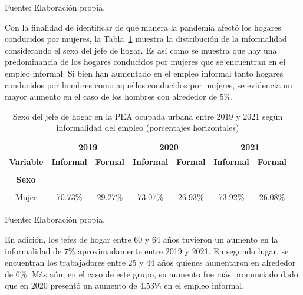 \documentclass[
  letterpaper,
  12pt,
  oneside,
  spanish,
  doublespacing,
  headsepline,
  parskip]{MastersDoctoralThesis}
\begin{document}
\noindent \small Fuente: Elaboración propia. \normalsize

Con la finalidad de identificar de qué manera la pandemia afectó los
hogares conducidos por mujeres, la Tabla~\ref{tbl-sex} muestra la
distribución de la informalidad considerando el sexo del jefe de hogar.
Es así como se muestra que hay una predominancia de los hogares
conducidos por mujeres que se encuentran en el empleo informal. Si bien
han aumentado en el empleo informal tanto hogares conducidos por hombres
como aquellos conducidos por mujeres, se evidencia un mayor aumento en
el caso de los hombres con alrededor de 5\%.

\hypertarget{tbl-sex}{}
\begin{table}[H]
\caption{\label{tbl-sex}Sexo del jefe de hogar en la PEA ocupada urbana entre 2019 y 2021 según
informalidad del empleo (porcentajes horizontales) }\tabularnewline

\centering\begingroup\fontsize{10}{12}\selectfont

\begin{tabular}{ccccccc}
\toprule
\multicolumn{1}{c}{ } & \multicolumn{2}{c}{\textbf{2019}} & \multicolumn{2}{c}{\textbf{2020}} & \multicolumn{2}{c}{\textbf{2021}} \\
\cmidrule(l{3pt}r{3pt}){2-3} \cmidrule(l{3pt}r{3pt}){4-5} \cmidrule(l{3pt}r{3pt}){6-7}
\textbf{Variable} & \textbf{Informal} & \textbf{Formal} & \textbf{Informal} & \textbf{Formal} & \textbf{Informal} & \textbf{Formal}\\
\midrule
\cellcolor{gray!6}{\textbf{Nacional}} & \cellcolor{gray!6}{62.98\%} & \cellcolor{gray!6}{37.02\%} & \cellcolor{gray!6}{66.17\%} & \cellcolor{gray!6}{33.83\%} & \cellcolor{gray!6}{68.45\%} & \cellcolor{gray!6}{31.55\%}\\
\textbf{Sexo} &  &  &  &  &  & \\
\cellcolor{gray!6}{Hombre} & \cellcolor{gray!6}{60.09\%} & \cellcolor{gray!6}{39.91\%} & \cellcolor{gray!6}{63.52\%} & \cellcolor{gray!6}{36.48\%} & \cellcolor{gray!6}{65.98\%} & \cellcolor{gray!6}{34.02\%}\\
Mujer & 70.73\% & 29.27\% & 73.07\% & 26.93\% & 73.92\% & 26.08\%\\
\bottomrule
\end{tabular}
\endgroup{}
\end{table}

\noindent \small Fuente: Elaboración propia. \normalsize

En adición, los jefes de hogar entre 60 y 64 años tuvieron un aumento en
la informalidad de 7\% aproximadamente entre 2019 y 2021. En segundo
lugar, se encuentran los trabajadores entre 25 y 44 años quienes
aumentaron en alrededor de 6\%. Más aún, en el caso de este grupo, su
aumento fue más pronunciado dado que en 2020 presentó un aumento de
4.53\% en el empleo informal.
\end{document}
